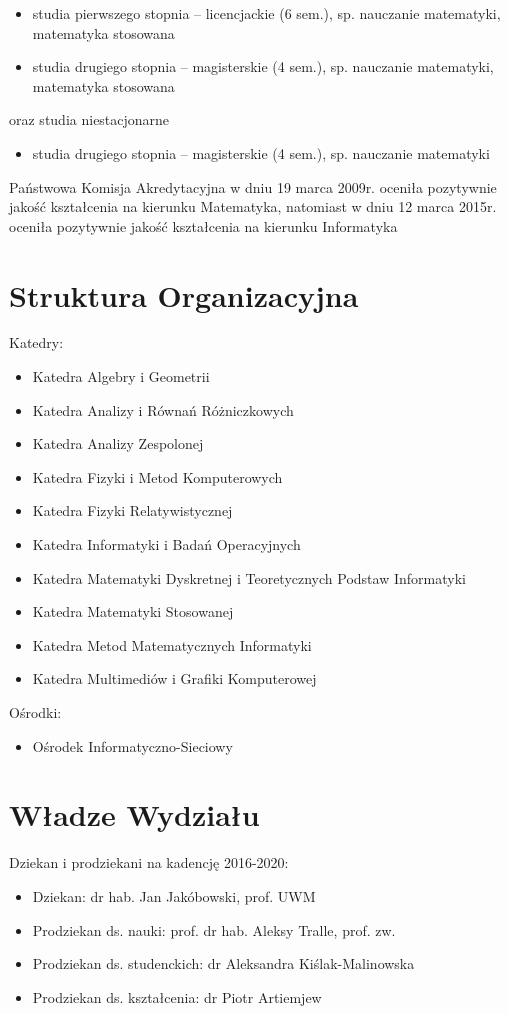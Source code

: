 \documentclass[a4paper,12pt]{article}
\begin{document}
\begin{itemize}
\item studia pierwszego stopnia – licencjackie (6 sem.), sp. nauczanie matematyki, matematyka stosowana
\item studia drugiego stopnia – magisterskie (4 sem.), sp. nauczanie matematyki, matematyka stosowana
\end{itemize}
oraz studia niestacjonarne
\begin{itemize}
\item studia drugiego stopnia – magisterskie (4 sem.), sp. nauczanie matematyki
\end{itemize}

Państwowa Komisja Akredytacyjna w dniu 19 marca 2009r. oceniła pozytywnie jakość kształcenia na kierunku
Matematyka, natomiast w dniu 12 marca 2015r. oceniła pozytywnie jakość kształcenia na kierunku
Informatyka

\section{Struktura Organizacyjna}
Katedry:
\begin{itemize}
\item Katedra Algebry i Geometrii
\item Katedra Analizy i Równań Różniczkowych
\item Katedra Analizy Zespolonej
\item Katedra Fizyki i Metod Komputerowych
\item Katedra Fizyki Relatywistycznej
\item Katedra Informatyki i Badań Operacyjnych
\item Katedra Matematyki Dyskretnej i Teoretycznych Podstaw Informatyki
\item Katedra Matematyki Stosowanej
\item Katedra Metod Matematycznych Informatyki
\item Katedra Multimediów i Grafiki Komputerowej

\end{itemize}
Ośrodki:
\begin{itemize}
\item Ośrodek Informatyczno-Sieciowy
\end {itemize}
\section {Władze Wydziału}
Dziekan i prodziekani na kadencję 2016-2020:
\begin {itemize}
\item Dziekan: dr hab. Jan Jakóbowski, prof. UWM
\item Prodziekan ds. nauki: prof. dr hab. Aleksy Tralle, prof. zw.
\item Prodziekan ds. studenckich: dr Aleksandra Kiślak-Malinowska
\item Prodziekan ds. kształcenia: dr Piotr Artiemjew
\end {itemize}
\end{document}
